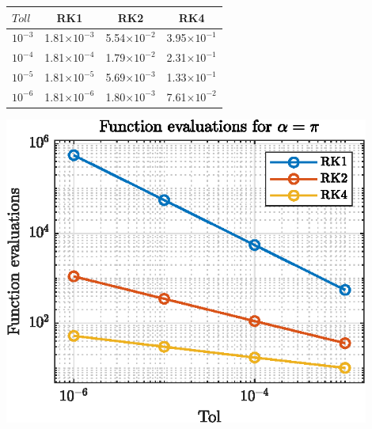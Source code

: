 \documentclass[11pt,a4paper,oneside]{article}
\begin{document}
\begin{minipage}{0.50\textwidth}
    \centering
    \begin{center}
        \captionsetup{type=table}
        \begin{tabular}{lccc}
            \toprule
            \toprule
            $Toll$ & RK1& RK2& RK4\\ 
            \midrule                    
            $10^{-3}$& 1.81$\times 10^{-3}$ & 5.54$\times 10^{-2}$ & 3.95$\times 10^{-1}$\\
            $10^{-4}$& 1.81$\times 10^{-4}$ & 1.79$\times 10^{-2}$ & 2.31$\times 10^{-1}$\\
            $10^{-5}$& 1.81$\times 10^{-5}$ & 5.69$\times 10^{-3}$ & 1.33$\times 10^{-1}$\\
            $10^{-6}$& 1.81$\times 10^{-6}$ & 1.80$\times 10^{-3}$ & 7.61$\times 10^{-2}$\\
            \bottomrule
            \bottomrule
        \end{tabular}
    \end{center}
\end{minipage}
\hfill
\begin{minipage}{0.45\textwidth}
    \centering
    \begin{center}
        \includegraphics[width=0.9\textwidth]{ex4_feval.eps}
        \captionsetup{type=figure}
    \end{center}
\end{minipage}
\end{document}
